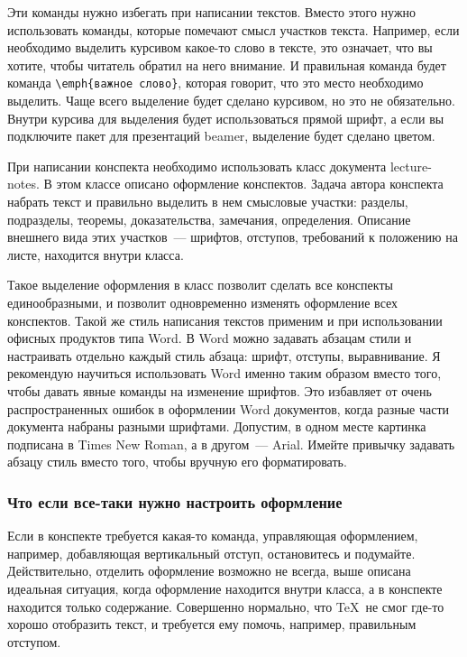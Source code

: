 \documentclass{article}
\begin{document}
    Эти команды нужно избегать при написании текстов. Вместо этого нужно использовать команды,
    которые помечают смысл участков текста. Например, если необходимо выделить курсивом
    какое-то слово в тексте, это означает, что вы хотите, чтобы читатель обратил на него внимание.
    И правильная команда будет команда \verb|\emph{важное слово}|, которая говорит, что
    это место необходимо выделить. Чаще всего выделение будет сделано курсивом, но это не
    обязательно. Внутри курсива для выделения будет использоваться прямой шрифт, а если вы
    подключите пакет для презентаций beamer, выделение будет сделано цветом.

    При написании конспекта необходимо использовать класс документа lecture-notes. В этом
    классе описано оформление конспектов. Задача автора конспекта набрать текст и правильно
    выделить в нем смысловые участки: разделы, подразделы, теоремы, доказательства, замечания,
    определения. Описание внешнего вида этих участков~--- шрифтов, отступов, требований к положению
    на листе, находится внутри класса.

    Такое выделение оформления в класс позволит сделать все конспекты единообразными,
    и позволит одновременно изменять оформление всех конспектов. Такой же стиль написания текстов
    применим и при использовании офисных продуктов типа Word. В Word можно задавать абзацам
    стили и настраивать отдельно каждый стиль абзаца: шрифт, отступы, выравнивание. Я рекомендую
    научиться использовать Word именно таким образом вместо того, чтобы давать явные команды
    на изменение шрифтов. Это избавляет от очень распространенных ошибок в оформлении Word
    документов, когда разные части документа набраны разными шрифтами. Допустим,
    в одном месте картинка подписана в Times New Roman, а в другом~--- Arial.
    Имейте привычку задавать абзацу стиль вместо того, чтобы вручную его форматировать.

    \subsubsection{Что если все-таки нужно настроить оформление}
    Если в конспекте требуется какая-то команда, управляющая оформлением, например,
    добавляющая вертикальный отступ, остановитесь и подумайте. Действительно, отделить
    оформление возможно не всегда, выше описана идеальная ситуация, когда оформление
    находится внутри класса, а в конспекте находится только содержание. Совершенно нормально,
    что \TeX\ не смог где-то хорошо отобразить текст, и требуется ему помочь, например,
    правильным отступом.
\end{document}
